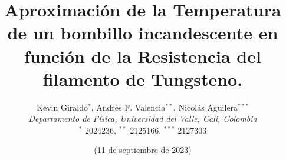 \title{\textbf{\large Aproximación de la Temperatura de un bombillo incandescente en función de la Resistencia del filamento de Tungsteno.}}

\author{Kevin Giraldo$^{*}$, Andrés F. Valencia$^{**}$, Nicolás Aguilera$^{***}$\\
\normalsize{\emph{Departamento de Física, Universidad del Valle, Cali, Colombia}}\\
\normalsize$^{*}$ 2024236, $^{**}$ 2125166, $^{***}$ 2127303
}
\date{(\small 11 de septiembre de 2023)}